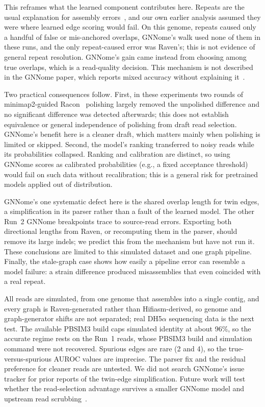 \documentclass[a4paper]{llncs}
\makeatletter
\renewcommand\section{\@startsection{section}{1}{\z@}{-13\p@ \@plus -3\p@ \@minus -3\p@}{7\p@ \@plus 2\p@ \@minus 2\p@}{\normalfont\large\bfseries\boldmath\rightskip=\z@ \@plus 8em\pretolerance=10000 }}
\makeatother
\begin{document}
This reframes what the learned component contributes here. Repeats are the usual explanation for assembly errors~\cite{tderrors}, and our own earlier analysis assumed they were where learned edge scoring would fail. On this genome, repeats caused only a handful of false or mis-anchored overlaps, GNNome's walk used none of them in these runs, and the only repeat-caused error was Raven's; this is not evidence of general repeat resolution. GNNome's gain came instead from choosing among true overlaps, which is a read-quality decision. This mechanism is not described in the GNNome paper, which reports mixed accuracy without explaining it~\cite{gnnome}.

Two practical consequences follow. First, in these experiments two rounds of minimap2-guided Racon~\cite{racon} polishing largely removed the unpolished difference and no significant difference was detected afterwards; this does not establish equivalence or general independence of polishing from draft read selection. GNNome's benefit here is a cleaner draft, which matters mainly when polishing is limited or skipped. Second, the model's ranking transferred to noisy reads while its probabilities collapsed. Ranking and calibration are distinct, so using GNNome scores as calibrated probabilities (e.g., a fixed acceptance threshold) would fail on such data without recalibration; this is a general risk for pretrained models applied out of distribution.

GNNome's one systematic defect here is the shared overlap length for twin edges, a simplification in its parser rather than a fault of the learned model. The other Run~2 GNNome breakpoints trace to source-read errors. Exporting both directional lengths from Raven, or recomputing them in the parser, should remove its large indels; we predict this from the mechanism but have not run it. These conclusions are limited to this simulated dataset and one graph pipeline. Finally, the stale-graph case shows how easily a pipeline error can resemble a model failure: a strain difference produced misassemblies that even coincided with a real repeat.

\section{Limitations and Future Work}\label{sec:limits}

All reads are simulated, from one genome that assembles into a single contig, and every graph is Raven-generated rather than Hifiasm-derived, so genome and graph-generator shifts are not separated; real DH5$\alpha$ sequencing data is the next test. The available PBSIM3 build caps simulated identity at about 96\%, so the accurate regime rests on the Run~1 reads, whose PBSIM3 build and simulation command were not recovered. Spurious edges are rare (2 and 4), so the true-versus-spurious AUROC values are imprecise. The parser fix and the residual preference for cleaner reads are untested. We did not search GNNome's issue tracker for prior reports of the twin-edge simplification. Future work will test whether the read-selection advantage survives a smaller GNNome model and upstream read scrubbing~\cite{miniscrub}.
\end{document}
